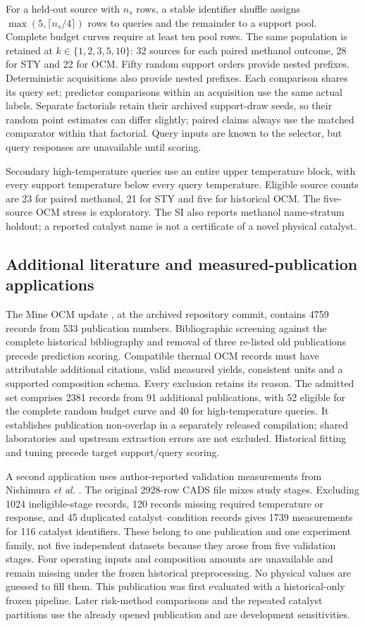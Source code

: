 \documentclass[11pt]{article}
\begin{document}
For a held-out source with $n_s$ rows, a stable identifier shuffle assigns $\max(5,\lceil n_s/4\rceil)$ rows to queries and the remainder to a support pool. Complete budget curves require at least ten pool rows. The same population is retained at $k\in\{1,2,3,5,10\}$: 32 sources for each paired methanol outcome, 28 for STY and 22 for OCM. Fifty random support orders provide nested prefixes. Deterministic acquisitions also provide nested prefixes. Each comparison shares its query set; predictor comparisons within an acquisition use the same actual labels. Separate factorials retain their archived support-draw seeds, so their random point estimates can differ slightly; paired claims always use the matched comparator within that factorial. Query inputs are known to the selector, but query responses are unavailable until scoring.

Secondary high-temperature queries use an entire upper temperature block, with every support temperature below every query temperature. Eligible source counts are 23 for paired methanol, 21 for STY and five for historical OCM. The five-source OCM stress is exploratory. The SI also reports methanol name-stratum holdout; a reported catalyst name is not a certificate of a novel physical catalyst.

\subsection{Additional literature and measured-publication applications}
The Mine OCM update \cite{mine}, at the archived repository commit, contains 4759 records from 533 publication numbers. Bibliographic screening against the complete historical bibliography and removal of three re-listed old publications precede prediction scoring. Compatible thermal OCM records must have attributable additional citations, valid measured yields, consistent units and a supported composition schema. Every exclusion retains its reason. The admitted set comprises 2381 records from 91 additional publications, with 52 eligible for the complete random budget curve and 40 for high-temperature queries. It establishes publication non-overlap in a separately released compilation; shared laboratories and upstream extraction errors are not excluded. Historical fitting and tuning precede target support/query scoring.

A second application uses author-reported validation measurements from Nishimura \emph{et al.} \cite{nishimura2023new}. The original 2928-row CADS file mixes study stages. Excluding 1024 ineligible-stage records, 120 records missing required temperature or response, and 45 duplicated catalyst--condition records gives 1739 measurements for 116 catalyst identifiers. These belong to one publication and one experiment family, not five independent datasets because they arose from five validation stages. Four operating inputs and composition amounts are unavailable and remain missing under the frozen historical preprocessing. No physical values are guessed to fill them. This publication was first evaluated with a historical-only frozen pipeline. Later risk-method comparisons and the repeated catalyst partitions use the already opened publication and are development sensitivities.
\end{document}
